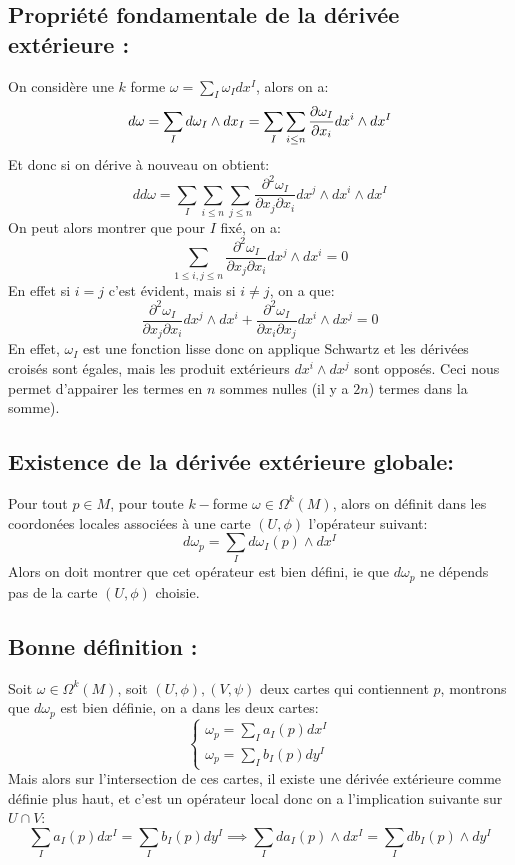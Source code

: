    \subsection*{Propriété fondamentale de la dérivée extérieure {:}}
   On considère une \( k \) forme \( \omega = \sum_I \omega_I dx^I\), alors on a:
   \[ 
      d\omega = \sum_I d\omega_I \wedge dx_I = \sum_I \sum_{i \leq n} \frac{\partial \omega_I}{\partial x_i}dx^i \wedge dx^I
   \]
   Et donc si on dérive à nouveau on obtient:
   \[ 
      dd\omega =  \sum_I \sum_{i \leq n} \sum_{j \leq n} \frac{\partial^2 \omega_I}{\partial x_j \partial x_i} dx^j \wedge dx^i \wedge dx^I
   \]
   On peut alors montrer que pour \( I \) fixé, on a:
   \[ 
      \sum_{1 \leq i, j\leq n} \frac{\partial^2 \omega_I}{\partial x_j \partial x_i} dx^j \wedge dx^i = 0
   \]
   En effet si \( i = j \) c'est évident, mais si \( i \neq j \), on a que:
   \[ 
      \frac{\partial^2 \omega_I}{\partial x_j \partial x_i} dx^j \wedge dx^i + \frac{\partial^2 \omega_I}{\partial x_i \partial x_j} dx^i \wedge dx^j = 0
   \]
   En effet, \( \omega_I \) est une fonction lisse donc on applique Schwartz et les dérivées croisés sont égales, mais les produit extérieurs \( dx^i \wedge dx^j \) sont opposés. Ceci nous permet d'appairer les termes en \( n \) sommes nulles (il y a \( 2n \)) termes dans la somme).
   \subsection*{Existence de la dérivée extérieure globale{:}}
   Pour tout \( p \in M \), pour toute \( k- \)forme \( \omega \in \Omega^k(M)\), alors on définit dans les coordonées locales associées à une carte \( (U, \phi) \) l'opérateur suivant:
   \[ 
      d\omega_p = \sum_I d\omega_I(p) \wedge dx^I
   \]
   Alors on doit montrer que cet opérateur est bien défini, ie que \( d\omega_p \) ne dépends pas de la carte \( (U, \phi) \) choisie.
   \subsection*{Bonne définition {:}}
   Soit \( \omega \in \Omega^k(M) \), soit \( (U, \phi), (V, \psi) \) deux cartes qui contiennent \( p \), montrons que \( d\omega_p \) est bien définie, on a dans les deux cartes:
   \[ 
      \begin{cases}
         \omega_p = \sum_I a_I(p)dx^I \\
         \omega_p = \sum_I b_I(p)dy^I
      \end{cases} 
   \]
   Mais alors sur l'intersection de ces cartes, il existe une dérivée extérieure comme définie plus haut, et c'est un opérateur local donc on a l'implication suivante sur \( U \cap V \):
   \[ 
      \sum_I a_I(p)dx^I = \sum_I b_I(p)dy^I \implies \sum_I da_I(p) \wedge dx^I = \sum_I db_I(p) \wedge dy^I
   \]
